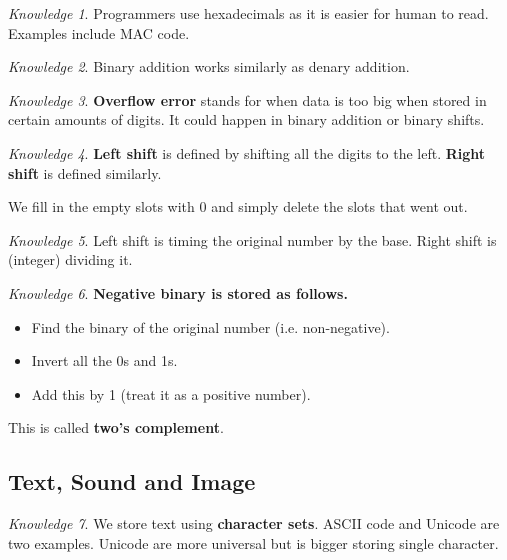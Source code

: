 \documentclass[8pt]{article}
\theoremstyle{remark}
\newtheorem{knowledge}{Knowledge}[subsection]
\begin{document}
        \begin{knowledge}
            Programmers use hexadecimals as it is easier for human to read. Examples include MAC code.
        \end{knowledge}

        \begin{knowledge}
            Binary addition works similarly as denary addition.
        \end{knowledge}

        \begin{knowledge}
            \textbf{Overflow error} stands for when data is too big when stored in certain amounts of digits. It could happen in binary addition or binary shifts.
        \end{knowledge}

        \begin{knowledge}
            \textbf{Left shift} is defined by shifting all the digits to the left. \textbf{Right shift} is defined similarly.

            We fill in the empty slots with 0 and simply delete the slots that went out.
        \end{knowledge}

        \begin{knowledge}
            Left shift is timing the original number by the base. Right shift is (integer) dividing it.
        \end{knowledge}

        \begin{knowledge}
            \textbf{Negative binary is stored as follows.}
            \begin{itemize}
                \item Find the binary of the original number (i.e. non-negative).
                \item Invert all the 0s and 1s.
                \item Add this by 1 (treat it as a positive number).
            \end{itemize}
            This is called \textbf{two's complement}.
        \end{knowledge}

        \subsection{Text, Sound and Image}

        \begin{knowledge}
            We store text using \textbf{character sets}. ASCII code and Unicode are two examples. Unicode are more universal but is bigger storing single character.
        \end{knowledge}
\end{document}
